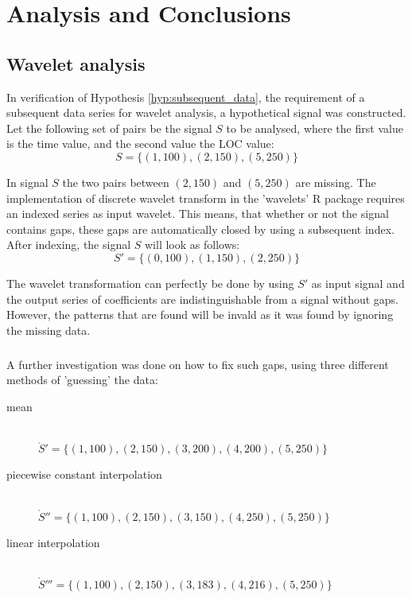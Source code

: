 \chapter{Analysis and Conclusions}
\label{analysis}

\section{Wavelet analysis}
In verification of Hypothesis \ref{hyp:subsequent_data}, the requirement of a
subsequent data series for wavelet analysis, a hypothetical signal was
constructed. Let the following set of pairs be the signal $S$ to be analysed,
where the first value is the time value, and the second value the LOC value:
$$S = \{(1,100), (2,150), (5,250)\}$$

\noindent
In signal $S$ the two pairs between $(2,150)$ and $(5,250)$ are missing. The
implementation of discrete wavelet transform in the 'wavelets' R package
requires an indexed series as input wavelet. This means, that whether or not
the signal contains gaps, these gaps are automatically closed by using a
subsequent index. After indexing, the signal $S$ will look as follows:
$$S' = \{(0,100), (1,150), (2,250)\}$$

\noindent
The wavelet transformation can perfectly be done by using $S'$ as input
signal and the output series of coefficients are indistinguishable from a
signal without gaps. However, the patterns that are found will be invald as it
was found by ignoring the missing data.

\paragraph{}
A further investigation was done on how to fix such gaps, using three different
methods of 'guessing' the data:
\begin{description}
	\item[mean] \hfill \\[1em]
	$\grave{S}' = \{(1,100), (2,150), (3,200), (4,200), (5,250)\}$
	
	\item[piecewise constant interpolation] \hfill \\[1em]
	$\grave{S}'' = \{(1,100), (2,150), (3,150), (4,250), (5,250)\}$
	
	\item[linear interpolation] \hfill \\[1em]
	$\grave{S}''' = \{(1,100), (2,150), (3,183), (4,216), (5,250)\}$
\end{description}

